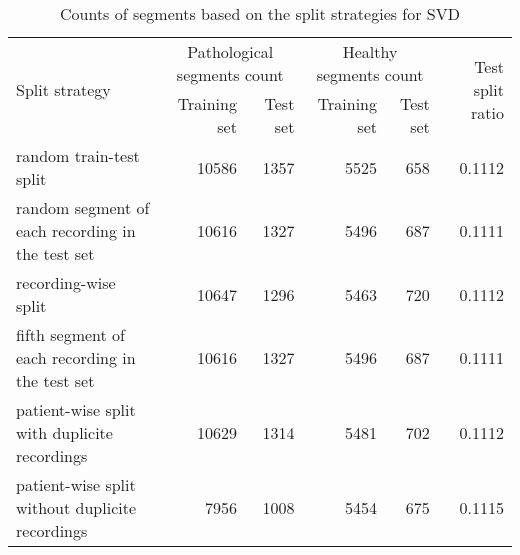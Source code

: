 \begin{table}
    \centering
    \tiny
    \begin{tabular}{lrrrrr}
        \toprule
        \multirow{2}{*}{Split strategy} & \multicolumn{2}{c}{Pathological segments count} & \multicolumn{2}{c}{Healthy segments count} & \multirow{2}{*}{Test split ratio} \\
        & Training set & Test set & Training set & Test set & \\
        \midrule
            random train-test split & 10586 & 1357 & 5525 & 658 & 0.1112 \\
			random segment of each recording in the test set & 10616 & 1327 & 5496 & 687 & 0.1111 \\
			recording-wise split & 10647 & 1296 & 5463 & 720 & 0.1112 \\
			fifth segment of each recording in the test set & 10616 & 1327 & 5496 & 687 & 0.1111 \\
			patient-wise split with duplicite recordings & 10629 & 1314 & 5481 & 702 & 0.1112 \\
			patient-wise split without duplicite recordings & 7956 & 1008 & 5454 & 675 & 0.1115 \\
        \bottomrule
    \end{tabular}
    \caption{Counts of segments based on the split strategies for SVD}
    \label{tab:svd_counts}
\end{table}
